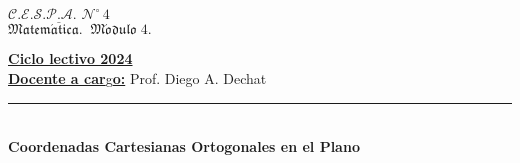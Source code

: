 \documentclass[a4paper,12pt]{article}
\newcommand{\HRule}{\rule{\linewidth}{0.5mm}}
\newcommand{\titolo}[1]{\Large{\bf {#1\\}}}
\begin{document}

\begin{center}
\Large{$\underline{\mathcal{C.E.S.P.A.\,\,N^\circ}\,\textit{4}}$}\\
\vspace{5mm}
${\mathfrak{ {Matem\acute a tica.\;\;M\acute o dulo \;4.}}}$\\
\vspace{-3mm}
\date{\today}
\end{center}
{\underline{\bf {Ciclo lectivo 2024}}}\\
\underline{\bf {Docente a car}}g\underline{\bf {o:}} Prof. Diego A. Dechat\\
\noindent
\HRule\\


{\titolo{Coordenadas Cartesianas Ortogonales en el Plano}}
\end{document}
